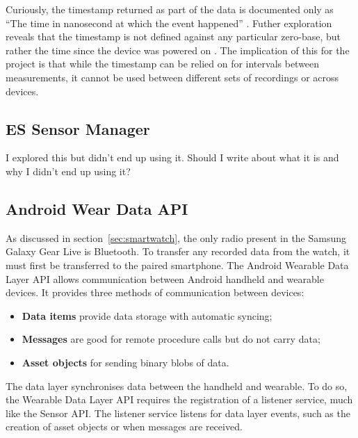       Curiously, the timestamp returned as part of the data is documented only as ``The time in nanosecond at which the event happened'' \cite{androidsensoreventapi}. Futher exploration reveals that the timestamp is not defined against any particular zero-base, but rather the time since the device was powered on \cite{androidissuedocumentationbug, androidissuehardwarebug}. The implication of this for the project is that while the timestamp can be relied on for intervals between measurements, it cannot be used between different sets of recordings or across devices.
      
      
    \subsection{ES Sensor Manager}
      I explored this but didn't end up using it. Should I write about what it is and why I didn't
      end up using it?

    \subsection{Android Wear Data API}
      As discussed in section~\ref{sec:smartwatch}, the only radio present in the Samsung Galaxy 
      Gear Live is Bluetooth. To transfer any recorded data from the watch, it must first be transferred to the paired smartphone. 
      The Android Wearable Data Layer API allows communication between Android handheld and wearable
      devices. It provides three methods of communication between devices:
      \begin{itemize}
        \item \textbf{Data items} provide data storage with automatic syncing;
        \item \textbf{Messages} are good for remote procedure calls but do not carry data;
        \item \textbf{Asset objects} for sending binary blobs of data.
      \end{itemize}
      
      The data layer synchronises data between the handheld and wearable. To do so, the Wearable Data Layer API requires the registration of a listener service, much like the Sensor API. The listener service listens for data layer events, such as the creation of asset objects or when messages are received.      
      
